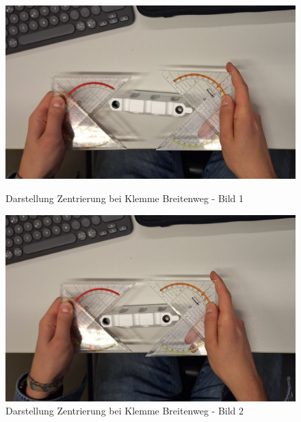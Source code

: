             \begin{figure}[h!]
                \centering
                \begin{minipage}{0.48\textwidth}
                    \centering
                    \includegraphics[width=\linewidth]{img/konzeptfindung/klemme_breitenweg_zentrierung_1.jpeg}
                    \caption{Darstellung Zentrierung bei Klemme Breitenweg - Bild 1}
                    \label{img:konzept_zentrierung_1}
                \end{minipage}
                \hfill
                \begin{minipage}{0.48\textwidth}
                    \centering
                    \includegraphics[width=\linewidth]{img/konzeptfindung/klemme_breitenweg_zentrierung_2.jpeg}
                    \caption{Darstellung Zentrierung bei Klemme Breitenweg - Bild 2}
                    \label{img:konzept_zentrierung_2}
                \end{minipage}
            \end{figure}



